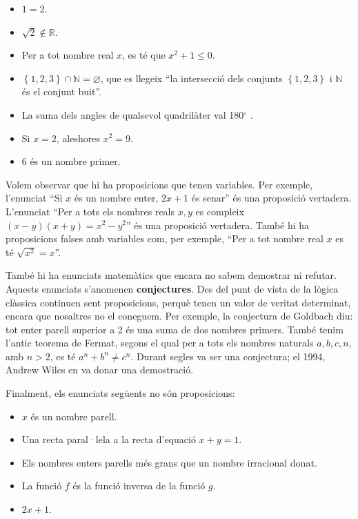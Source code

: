 \begin{itemize}
\item $1=2$.

\item $\sqrt{2}\notin\mathbb{R}$.

\item Per a tot nombre real $x$, es té que $x^{2}+1\leq0$.

\item $\left\{ 1,2,3\right\} \cap\mathbb{N}=\varnothing$, que es llegeix \enquote{la
intersecció dels conjunts $\left\{ 1,2,3\right\} $ i $\mathbb{N}$ és
el conjunt buit}.

\item La suma dels angles de qualsevol quadrilàter val 180$^\circ$
.

\item Si $x=2$, aleshores $x^{2}=9$.

\item 6 és un nombre primer.
\end{itemize}

Volem observar que hi ha proposicions que tenen variables. Per exemple,
l'enunciat \enquote{Si $x$ és un nombre enter, $2x+1$ és senar} és una
proposició vertadera. L'enunciat \enquote{Per a tots els nombres reals $x,y$ es
compleix $(x-y)(x+y)=x^{2}-y^{2}$} és una proposició vertadera. També hi ha proposicions falses amb variables com, per exemple, \enquote{Per a tot
nombre real $x$ es té $\sqrt{x^{2}}=x$}.

També hi ha enunciats matemàtics que encara no sabem demostrar ni
refutar. Aquests enunciats s'anomenen \textbf{conjectures}. Des del punt de
vista de la lògica clàssica continuen sent proposicions, perquè tenen
un valor de veritat determinat, encara que nosaltres no el coneguem. Per
exemple, la conjectura de Goldbach diu: tot enter parell superior a 2 és una
suma de dos nombres primers. També tenim l'antic teorema de Fermat, segons el
qual per a tots els nombres naturals $a,b,c,n$, amb $n>2$, es té
$a^{n}+b^{n}\neq c^{n}$. Durant segles va ser una conjectura; el 1994, Andrew
Wiles en va donar una demostració.

Finalment, els enunciats següents no són proposicions:

\begin{itemize}
\item $x$ és un nombre parell.

\item Una recta paral·lela a la recta d'equació $x+y=1.$

\item Els nombres enters parells més grans que un nombre irracional donat.

\item La funció $f$ és la funció inversa de la funció $g$.

\item $2x+1$.
\end{itemize}

